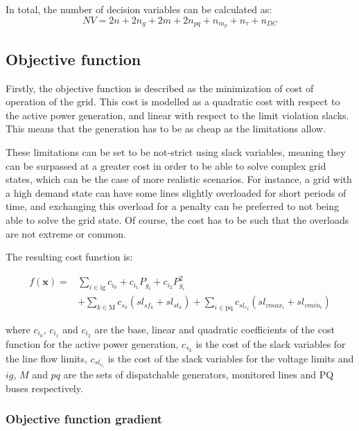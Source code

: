 In total, the number of decision variables can be calculated as:
\begin{equation}
    NV = 2n + 2n_g + 2m + 2n_{pq} + n_{m_p} + n_{\tau} + n_{DC} 
\end{equation}

\subsection{Objective function}

Firstly, the objective function is described as the minimization of cost of operation of the grid. This cost is modelled as a quadratic cost
with respect to the active power generation, and linear with respect to the limit violation slacks. This means that the generation has to be 
as cheap as the limitations allow.

These limitations can be set to be not-strict using slack variables, meaning they can be surpassed at a greater cost in order to be able to solve complex grid states, which can be the case of more realistic scenarios. 
For instance, a grid with a high demand state can have some lines slightly overloaded for short periods of time, and exchanging this overload for a penalty
can be preferred to not being able to solve the grid state. Of course, the cost has to be such that the overloads are not extreme or common.

The resulting cost function is:

\begin{equation}
    \begin{split}
        f(\bm{x}) = & \sum_{i \in \text{ig}} c_{i_0} + c_{i_1}P_{g_i} + c_{i_2}P_{g_i}^{2}  \\
        &+ \sum_{k \in \text{M}} c_{s_k} (sl_{sf_k} + sl_{st_k}) + \sum_{i \in \text{pq}} c_{{sl_v}_i} (sl_{vmax_i} + sl_{vmin_i})
    \end{split}
\end{equation}

where $c_{i_0}$, $c_{i_1}$ and $c_{i_2}$ are the base, linear and quadratic coefficients of the cost function for the active power generation, 
$c_{s_k}$ is the cost of the slack variables for the line flow limits, $c_{sl_{v_i}}$ is the cost of the slack variables for the voltage limits and $ig$, $M$ and $pq$ are the sets of dispatchable generators,
monitored lines and PQ buses respectively. 

\subsubsection{Objective function gradient}

